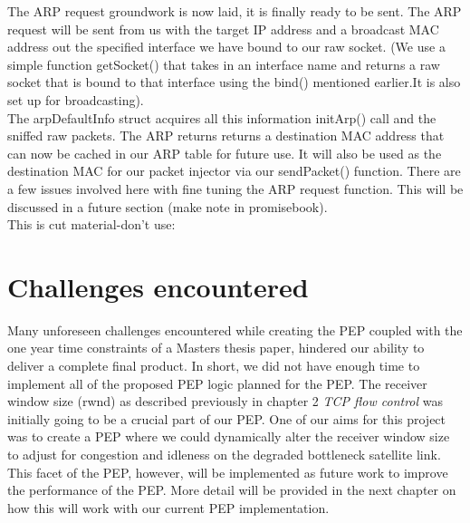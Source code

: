 \documentclass{uathesis}
\begin{document}
\begin{appendices}
The ARP request groundwork is now laid, it is finally ready to be sent. The ARP request will be sent from us with the target IP address and a broadcast MAC address out the specified interface we have bound to our raw socket. (We use a simple function getSocket() that takes in an interface name and returns a raw socket that is bound to that interface using the bind() mentioned earlier.It is also set up for broadcasting). \\

The arpDefaultInfo struct acquires all this information initArp() call and the sniffed raw packets. The ARP returns returns a destination MAC address that can now be cached in our ARP table for future use. It will also be used as the destination MAC for our packet injector via our sendPacket() function. There are a few issues involved here with fine tuning the ARP request function. This will be discussed in a future section (make note in promisebook).\\

This is cut material-don't use:

\section{Challenges encountered}

Many unforeseen challenges encountered while creating the PEP coupled with the one year time constraints of a Masters thesis paper, hindered our ability to deliver a complete final product. In short, we did not have enough time to implement all of the proposed PEP logic planned for the PEP. The receiver window size (rwnd) as described previously in chapter 2 \emph{TCP flow control} was initially going to be a crucial part of our PEP. One of our aims for this project was to create a PEP where we could dynamically alter the receiver window size to adjust for congestion and idleness on the degraded bottleneck satellite link. This facet of the PEP, however, will be implemented as future work to improve the performance of the PEP. More detail will be provided in the next chapter on how this will work with our current PEP implementation.


\end{appendices}
\end{document}
